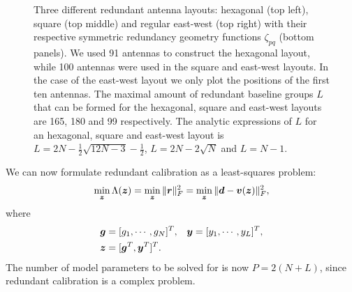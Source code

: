 \documentclass[useAMS,usenatbib]{mn2e}
\newcommand{\bz}{\bmath{z}}
\newcommand{\br}{\bmath{r}}
\newcommand{\bg}{\bmath{g}}
\newcommand{\bd}{\bmath{d}}
\newcommand{\bv}{\bmath{v}}
\newcommand{\by}{\bmath{y}}
\begin{document}
\begin{figure}
\caption{Three different redundant antenna layouts: hexagonal (top left), square (top middle) and regular east-west (top right) with their respective symmetric redundancy geometry functions $\zeta_{pq}$ (bottom panels). We used 91 antennas to construct the hexagonal layout, while 100 antennas were used in the square and east-west layouts. In the case of the east-west layout we only plot the positions of the first ten antennas. The maximal amount of redundant baseline groups $L$ that can be formed for 
the hexagonal, square and east-west layouts are 165, 180 and 99 respectively. The analytic expressions of $L$ for an hexagonal, square and east-west layout is $L = 2N-\frac{1}{2}\sqrt{12N-3}-\frac{1}{2}$,
$L=2N-2\sqrt{N}$ and $L=N-1$.\label{fig:geometry_function}}
\end{figure}

We can now formulate redundant calibration as a least-squares problem:
\begin{equation}
\label{eq:least_squares_red}
\min_{\bz} \Lambda(\bz) = \min_{\bz} \|\br\|_F^2 = \min_{\bz} \|\bd - \bv(\bz)\|_F^2, 
\end{equation}
where
\begin{align}
 \bg &=[g_1,\cdots,g_N]^T, & \by &= [y_1,\cdots,y_L]^T,\nonumber\\
 \bz &= [\bg^T,\by^T]^T. &  &\label{eq:parm_definitions}
 \end{align}
The number of model parameters to be solved for is now $P = 2(N+L)$, since redundant calibration is a complex problem.
\end{document}
